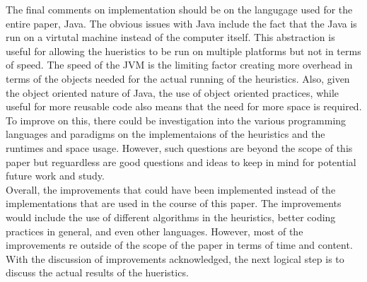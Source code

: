 \documentclass[midd]{thesis}
\newcommand{\tab}{\hspace*{2em}}
\begin{document}
\tab The final comments on implementation should be on the langugage used for the entire paper, Java. The obvious issues with Java include the fact that the Java is run on a virtutal machine instead of the computer itself. This abstraction is useful for allowing the hueristics to be run on multiple platforms but not in terms of speed. The speed of the JVM is the limiting factor creating more overhead in terms of the objects needed for the actual running of the heuristics. Also, given the object oriented nature of Java, the use of object oriented practices, while useful for more reusable code also means that the need for more space is required. To improve on this, there could be investigation into the various programming languages and paradigms on the implementaions of the heuristics and the runtimes and space usage. However, such questions are beyond the scope of this paper but reguardless are good questions and ideas to keep in mind for potential future work and study.\\
\tab Overall, the improvements that could have been implemented instead of the implementations that are used in the course of this paper. The improvements would include the use of different algorithms in the heuristics, better coding practices in general, and even other languages. However, most of the improvements re outside of the scope of the paper in terms of time and content. With the discussion of improvements acknowledged, the next logical step is to discuss the actual results of the hueristics.
\end{document}
